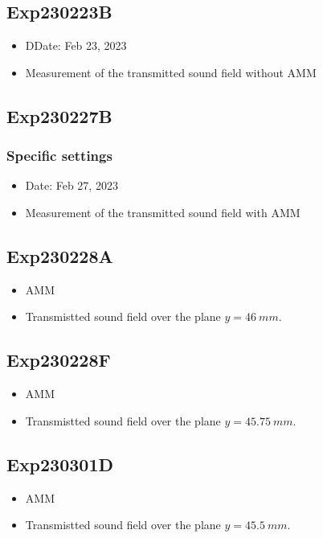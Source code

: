 \documentclass{article}
\begin{document}
\subsection{Exp230223B}
\label{sec:exp230223B}
\begin{itemize}
    \item DDate: Feb 23, 2023
    \item Measurement of the transmitted sound field without AMM
\end{itemize}

\subsection{Exp230227B}
\label{sec:exp230227B}

\subsubsection{Specific settings}
\begin{itemize}
    \item Date: Feb 27, 2023
    \item Measurement of the transmitted sound field with AMM
\end{itemize}

\subsection{Exp230228A}
\label{sec:exp230228A}
\begin{itemize}
    \item AMM
    \item Transmistted sound field over the plane $y=\SI{46}{mm}$.
\end{itemize}

\subsection{Exp230228F}
\label{sec:exp230228F}
\begin{itemize}
    \item AMM
    \item Transmistted sound field over the plane $y=\SI{45.75}{mm}$.
\end{itemize}

\subsection{Exp230301D}
\label{sec:exp230301D}
\begin{itemize}
    \item AMM
    \item Transmistted sound field over the plane $y=\SI{45.5}{mm}$.
\end{itemize}
\end{document}

